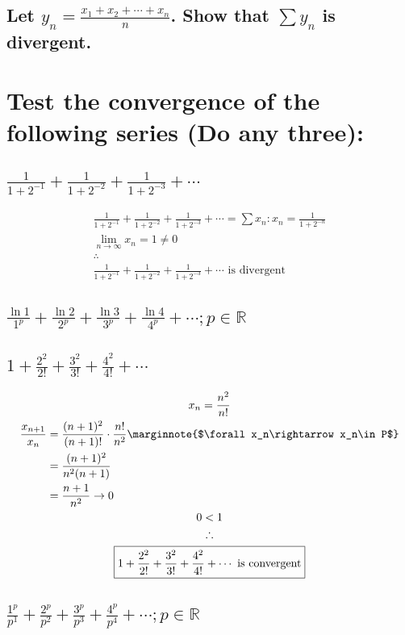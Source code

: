 \documentclass[letterpaper]{article}
\begin{document}
\subsection{Let $y_n=\frac{x_1+x_2+\dotsb+x_n}{n}$. Show that $\sum y_n$ is divergent.}

\section{Test the convergence of the following series (\textbf{Do any three}):}
\subsection{$\frac{1}{1+2^{-1}}+\frac{1}{1+2^{-2}}+\frac{1}{1+2^{-3}}+\dotsb$}
\begin{gather*}
\frac{1}{1+2^{-1}}+\frac{1}{1+2^{-2}}+\frac{1}{1+2^{-3}}+\dotsb=\sum x_n:x_n=\frac{1}{1+2^{-n}} \\
\lim_{n\rightarrow\infty}x_n=1\neq0 \\
\therefore \\
\boxed{\frac{1}{1+2^{-1}}+\frac{1}{1+2^{-2}}+\frac{1}{1+2^{-3}}+\dotsb\text{ is divergent}}
\end{gather*}
\subsection{$\frac{\ln1}{1^p}+\frac{\ln2}{2^p}+\frac{\ln3}{3^p}+\frac{\ln4}{4^p}+\dotsb;p\in\mathbb{R}$}
\subsection{$1+\frac{2^2}{2!}+\frac{3^2}{3!}+\frac{4^2}{4!}+\dotsb$}
\begin{gather*}
x_n=\frac{n^2}{n!} \\
\begin{aligned}	
\frac{x_{n+1}}{x_n}&=\frac{(n+1)^2}{(n+1)!}\cdot\frac{n!}{n^2} \marginnote{$\forall x_n\rightarrow x_n\in P$} \\
&=\frac{(n+1)^2}{n^2(n+1)} \\
&=\frac{n+1}{n^2} \rightarrow 0
\end{aligned} \\
0<1 \\
\therefore \\
\boxed{1+\frac{2^2}{2!}+\frac{3^2}{3!}+\frac{4^2}{4!}+\dotsb\text{ is convergent}}
\end{gather*}
\subsection{$\frac{1^p}{p^1}+\frac{2^p}{p^2}+\frac{3^p}{p^3}+\frac{4^p}{p^4}+\dotsb;p\in\mathbb{R}$}
\end{document}
